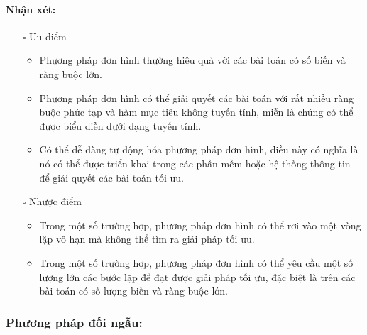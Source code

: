 \documentclass{article}
\begin{document}
\paragraph{Nhận xét:}
\begin{itemize}
    \item [$\square$] Ưu điểm
    \begin{itemize}[label=\textbullet]
        \item Phương pháp đơn hình thường hiệu quả với các bài toán có số biến và ràng buộc lớn. 
        \item Phương pháp đơn hình có thể giải quyết các bài toán với rất nhiều ràng buộc phức tạp và hàm mục tiêu không tuyến tính, miễn là chúng có thể được biểu diễn dưới dạng tuyến tính.
        \item Có thể dễ dàng tự động hóa phương pháp đơn hình, điều này có nghĩa là nó có thể được triển khai trong các phần mềm hoặc hệ thống thông tin để giải quyết các bài toán tối ưu.
    \end{itemize}
    \item [$\square$] Nhược điểm
    \begin{itemize}[label=\textbullet]
        \item Trong một số trường hợp, phương pháp đơn hình có thể rơi vào một vòng lặp vô hạn mà không thể tìm ra giải pháp tối ưu.
        \item Trong một số trường hợp, phương pháp đơn hình có thể yêu cầu một số lượng lớn các bước lặp để đạt được giải pháp tối ưu, đặc biệt là trên các bài toán có số lượng biến và ràng buộc lớn.
    \end{itemize}
\end{itemize}
\subsubsection{Phương pháp đối ngẫu:}
\end{document}
